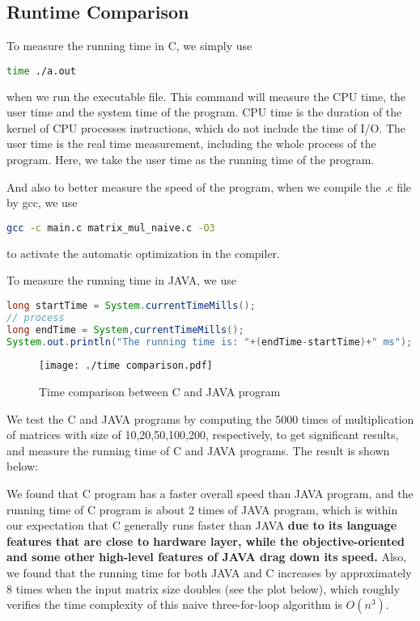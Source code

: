 \documentclass[12pt]{article}
\begin{document}
	\subsection{Runtime Comparison}
	To measure the running time in C, we simply use
	\begin{lstlisting}[language = bash]
time ./a.out
	\end{lstlisting}
	when we run the executable file. This command will measure the CPU time, the user time and the system time of the program. CPU time is the duration of the kernel of CPU processes instructions, which do not include the time of I/O. The user time is the real time measurement, including the whole process of the program. Here, we take the user time as the running time of the program.\par
	And also to better measure the speed of the program, when we compile the .c file by gcc, we use
	\begin{lstlisting}[language=bash]
gcc -c main.c matrix_mul_naive.c -O3
	\end{lstlisting}
	to activate the automatic optimization in the compiler.\\\par
	To measure the running time in JAVA, we use 
	\begin{lstlisting}[language=java]
long startTime = System.currentTimeMills();
// process
long endTime = System,currentTimeMills();
System.out.println("The running time is: "+(endTime-startTime)+" ms");
	\end{lstlisting}\par
	\begin{figure}[htbp]
		\centering
		\texttt{[image: ./time comparison.pdf]}
		\caption{Time comparison between C and JAVA program}
	\end{figure}
	We test the C and JAVA programs by computing the 5000 times of multiplication of matrices with size of 10,20,50,100,200, respectively, to get significant results, and measure the running time of C and JAVA programs. The result is shown below:	
	\par
	We found that C program has a faster overall speed than JAVA program, and the running time of C program is about 2 times of JAVA program, which is within our expectation that C generally runs faster than JAVA\textbf{ due to its language features that are close to hardware layer, while the objective-oriented and some other high-level features of JAVA drag down its speed. } Also, we found that the running time for both JAVA and C increases by approximately 8 times when the input matrix size doubles (see the plot below), which roughly verifies the time complexity of this naive three-for-loop algorithm is $O(n^3)$.
\end{document}
